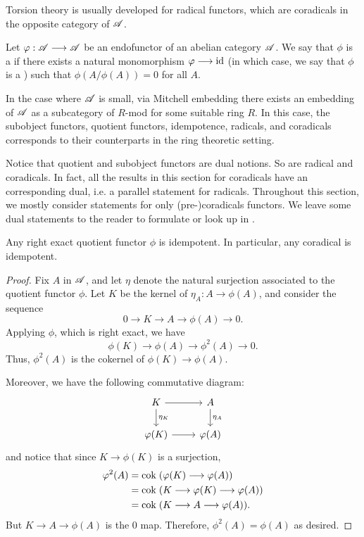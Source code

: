 Torsion theory is usually developed for radical functors, which 
are coradicals in the opposite category of $\mathscr{A}$.

\begin{defn}\label{def_radical}
Let $\varphi: \mathscr{A} \longrightarrow \mathscr{A}$ be an endofunctor of an abelian 
category $\mathscr{A}$. We say that $\phi$ is a  if 
there exists a natural monomorphism $\varphi \longrightarrow \mathrm{id}$ (in which case, we
say that $\phi$ is a ) such that 
$\phi(A/\phi(A)) = 0$ for all $A$. 
\end{defn}

\begin{rmk}
In the case where $\mathscr{A}$ is small, via Mitchell embedding 
there exists an embedding of $\mathscr{A}$ as a subcategory of $R$-mod
for some suitable ring $R$. In this case, the subobject functors, 
quotient functors, idempotence, radicals, and coradicals 
corresponds to their counterparts in the ring theoretic setting.
\end{rmk}

\begin{rmk}\label{rmk_rad_corad_dual}
Notice that quotient and subobject functors are dual notions. So 
are radical and coradicals. In fact, all the results in this 
section for coradicals have an corresponding dual, i.e. a parallel 
statement for radicals. Throughout this section, we mostly 
consider statements for only (pre-)coradicals functors. We leave 
some dual statements to the reader to formulate or look up in 
\cite{DTor}.
\end{rmk}

\begin{prop}\label{prop_idempotence}
Any right exact quotient functor $\phi$ is idempotent. In 
particular, any coradical is idempotent.
\end{prop}
\begin{proof}
Fix $A$ in $\mathscr{A}$, and let $\eta$ denote the natural surjection 
associated to the quotient functor $\phi$. Let $K$ be the kernel 
of $\eta_A: A \to \phi(A)$, and consider the sequence
\[
0 \to K \to A \to \phi(A) \to 0.
\]
Applying $\phi$, which is right exact, we have
\[
\phi(K) \to \phi(A) \to \phi^2(A) \to 0.
\]
Thus, $\phi^2(A)$ is the cokernel of $\phi(K) \to \phi(A)$.

Moreover, we have the following commutative diagram:
\[
\begin{tikzcd}
K \arrow{r} \arrow{d}{\eta_K} &
A \arrow{d}{\eta_A} \\
\phi(K) \arrow{r} &
\phi(A)
\end{tikzcd}
\]
and notice that since $K \to \phi(K)$ is a surjection,
\begin{align*}
\varphi^2(A) &= \mathrm{cok}\; (\varphi(K) \longrightarrow \varphi(A)) \\
          &= \mathrm{cok}\; (K \longrightarrow \varphi(K) \longrightarrow \varphi(A)) \\
          &= \mathrm{cok}\; (K \longrightarrow A \longrightarrow \varphi(A)).
\end{align*}
But $K \to A \to \phi(A)$ is the $0$ map. Therefore, $\phi^2(A) = 
\phi(A)$ as desired.
\end{proof}

